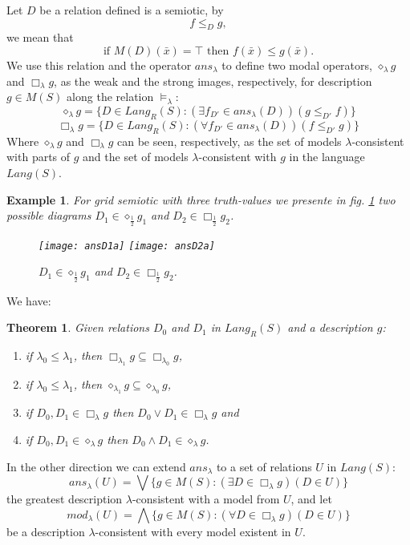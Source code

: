 \documentclass[oribibl]{llncs}
\newtheorem{thm}{Theorem}
\newtheorem{exam}{Example}
\begin{document}
Let $D$ be a relation defined is a semiotic, by
  \[f\leq_Dg,\]
we mean that
  \[\text{if } M(D)(\bar{x})=\top \text{ then } f(\bar{x})\leq g(\bar{x}).\]
We use this relation and the operator $ans_\lambda$ to define two
modal operators, $\diamond_\lambda g$ and $\Box_\lambda g$, as the
weak and the strong images, respectively, for description $g\in
M(S)$ along the relation $\models_\lambda$:
\[\diamond_\lambda g=\{D\in Lang_R(S): (\exists f_{D'}\in ans_\lambda(D)) (g\leq_{D'} f) \} \]
\[\Box_\lambda g=\{D\in Lang_R(S): (\forall f_{D'}\in ans_\lambda(D))(f\leq_{D'} g) \} \]
Where $\diamond_\lambda g$ and $\Box_\lambda g$ can be seen,
respectively, as the set of models $\lambda$-consistent with parts
of $g$ and the set of models $\lambda$-consistent with $g$ in the
language $Lang(S)$.
\begin{exam}
For grid semiotic with three truth-values we presente in fig. \ref{grid2} two possible diagrams $D_1\in \diamond_{\frac{1}{2}} g_1$ and $D_2\in\Box_{\frac{1}{2}} g_2$.

\begin{figure}[h]
\begin{center}
\texttt{[image: ansD1a]} \hspace{1cm}
\texttt{[image: ansD2a]}
\end{center}
\caption{$D_1\in \diamond_{\frac{1}{2}} g_1$ and $D_2\in\Box_{\frac{1}{2}} g_2$.}\label{grid2}
\end{figure}
\end{exam}

We have:

\begin{thm}
Given relations $D_0$ and $D_1$ in $Lang_R(S)$ and a description
$g$:
\begin{enumerate}
  \item if $\lambda_0\leq\lambda_1$, then $\Box_{\lambda_1} g\subseteq
  \Box_{\lambda_0} g$,
  \item if $\lambda_0\leq\lambda_1$, then $\diamond_{\lambda_1} g\subseteq
  \diamond_{\lambda_0} g$,
  \item if $D_0,D_1\in \Box_\lambda g$ then $D_0\vee D_1\in \Box_\lambda
  g$ and
  \item if $D_0,D_1\in \diamond_\lambda g$ then $D_0\wedge D_1\in \diamond_\lambda
  g$.
\end{enumerate}
\end{thm}

In the other direction we can extend $ans_\lambda$ to a set of
relations $U$ in $Lang(S)$:
\[ ans_\lambda(U)=\bigvee\{g \in  M(S): (\exists D \in \Box_\lambda g)(D\in U)\}\]
the greatest description $\lambda$-consistent with a model from $U$,
and let
\[ mod_\lambda(U)=\bigwedge\{g \in  M(S): (\forall D \in \Box_\lambda g)(D\in U)\}\]
be a description $\lambda$-consistent with every model existent in
$U$.
\end{document}
